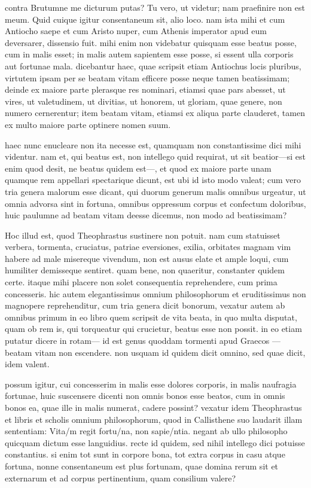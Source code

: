 contra Brutumne me dicturum putas? Tu vero, ut videtur; nam praefinire non est meum. Quid cuique igitur consentaneum sit, alio loco. nam ista mihi et cum Antiocho saepe et cum Aristo nuper, cum Athenis imperator apud eum deversarer, dissensio fuit. mihi enim non videbatur quisquam esse beatus posse, cum in malis esset; in malis autem sapientem esse posse, si essent ulla corporis aut fortunae mala. dicebantur haec, quae scripsit etiam Antiochus locis pluribus, virtutem ipsam per se beatam vitam efficere posse neque tamen beatissimam; deinde ex maiore parte plerasque res nominari, etiamsi quae pars abesset, ut vires, ut valetudinem, ut divitias, ut honorem, ut gloriam, quae genere, non numero cernerentur; item beatam vitam, etiamsi ex aliqua parte clauderet, tamen ex multo maiore parte optinere nomen suum.

 haec nunc enucleare non ita necesse est, quamquam non constantissime dici mihi videntur. nam et, qui beatus est, non intellego quid requirat, ut sit beatior—si est enim quod desit, ne beatus quidem est—, et quod ex maiore parte unam quamque rem appellari spectarique dicunt, est ubi id isto modo valeat; cum vero tria genera malorum esse dicant, qui duorum generum malis omnibus urgeatur, ut omnia advorsa sint in fortuna, omnibus oppressum corpus et confectum doloribus, huic paulumne ad beatam vitam deesse dicemus, non modo ad beatissimam?

 Hoc illud est, quod Theophrastus sustinere non potuit. nam cum statuisset verbera, tormenta, cruciatus, patriae eversiones, exilia, orbitates magnam vim habere ad male misereque vivendum, non est ausus elate et ample loqui, cum humiliter demisseque sentiret. quam bene, non quaeritur, constanter quidem certe. itaque mihi placere non solet consequentia reprehendere, cum prima concesseris. hic autem elegantissimus omnium philosophorum et eruditissimus non magnopere reprehenditur, cum tria genera dicit bonorum, vexatur autem ab omnibus primum in eo libro quem scripsit de vita beata, in quo multa disputat, quam ob rem is, qui torqueatur qui crucietur, beatus esse non possit. in eo etiam putatur dicere in rotam— id est genus quoddam tormenti apud Graecos —beatam vitam non escendere. non usquam id quidem dicit omnino, sed quae dicit, idem valent.

 possum igitur, cui concesserim in malis esse dolores corporis, in malis naufragia fortunae, huic suscensere dicenti non omnis bonos esse beatos, cum in omnis bonos ea, quae ille in malis numerat, cadere possint? vexatur idem Theophrastus et libris et scholis omnium philosophorum, quod in Callisthene suo laudarit illam sententiam: Vita/m regit fortu/na, non sapie/ntia. negant ab ullo philosopho quicquam dictum esse languidius. recte id quidem, sed nihil intellego dici potuisse constantius. si enim tot sunt in corpore bona, tot extra corpus in casu atque fortuna, nonne consentaneum est plus fortunam, quae domina rerum sit et externarum et ad corpus pertinentium, quam consilium valere?

